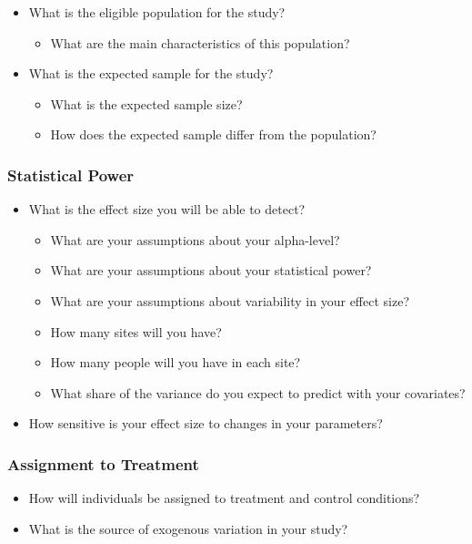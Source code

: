 \documentclass[12pt]{article}
\begin{document}
\begin{itemize}
\item What is the eligible population for the study?
\begin{itemize}
\item What are the main characteristics of this population?
\end{itemize}
\item What is the expected sample for the study?
\begin{itemize}
\item What is the expected sample size?
\item How does the expected sample differ from the population?
\end{itemize}
\end{itemize}

\subsubsection{Statistical Power}

\begin{itemize}
\item What is the effect size you will be able to detect?
\begin{itemize} 
\item What are your assumptions about your alpha-level?
\item What are your assumptions about your statistical power?
\item What are your assumptions about variability in your effect size?
\item How many sites will you have?
\item How many people will you have in each site?
\item What share of the variance do you expect to predict with your covariates?
\end{itemize}
\item How sensitive is your effect size to changes in your parameters?
\end{itemize}

\subsubsection{Assignment to Treatment}

\begin{itemize}
\item How will individuals be assigned to treatment and control conditions?
\item What is the source of exogenous variation in your study?
\end{itemize}
\end{document}
